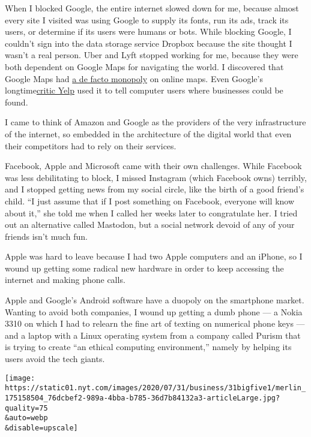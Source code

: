 When I blocked Google, the entire internet slowed down for me, because
almost every site I visited was using Google to supply its fonts, run
its ads, track its users, or determine if its users were humans or bots.
While blocking Google, I couldn't sign into the data storage service
Dropbox because the site thought I wasn't a real person. Uber and Lyft
stopped working for me, because they were both dependent on Google Maps
for navigating the world. I discovered that Google Maps had
\href{https://i.kinja-img.com/gawker-media/image/upload/c_scale,f_auto,fl_progressive,pg_1,q_80,w_1600/zrwbegnvl9qrpiyaerqv.png}{a
de facto monopoly} on online maps. Even Google's
longtime\href{https://www.nytimes.com/2017/07/01/technology/yelp-google-european-union-antitrust.html}{critic
Yelp} used it to tell computer users where businesses could be found.

I came to think of Amazon and Google as the providers of the very
infrastructure of the internet, so embedded in the architecture of the
digital world that even their competitors had to rely on their services.

Facebook, Apple and Microsoft came with their own challenges. While
Facebook was less debilitating to block, I missed Instagram (which
Facebook owns) terribly, and I stopped getting news from my social
circle, like the birth of a good friend's child. ``I just assume that if
I post something on Facebook, everyone will know about it,'' she told me
when I called her weeks later to congratulate her. I tried out an
alternative called Mastodon, but a social network devoid of any of your
friends isn't much fun.

Apple was hard to leave because I had two Apple computers and an iPhone,
so I wound up getting some radical new hardware in order to keep
accessing the internet and making phone calls.

Apple and Google's Android software have a duopoly on the smartphone
market. Wanting to avoid both companies, I wound up getting a dumb phone
--- a Nokia 3310 on which I had to relearn the fine art of texting on
numerical phone keys --- and a laptop with a Linux operating system from
a company called Purism that is trying to create ``an ethical computing
environment,'' namely by helping its users avoid the tech giants.

\texttt{[image: https://static01.nyt.com/images/2020/07/31/business/31bigfive1/merlin\_175158504\_76dcbef2-989a-4bba-b785-36d7b84132a3-articleLarge.jpg?quality=75\\\&auto=webp\\\&disable=upscale]}

